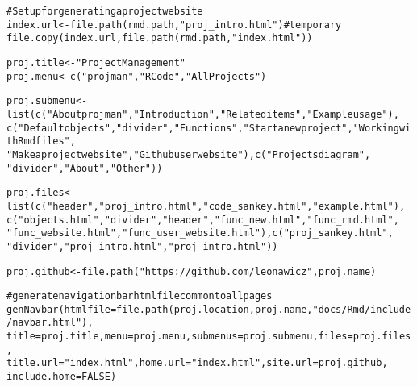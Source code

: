 \documentclass{article}\usepackage[]{graphicx}\usepackage[]{color}
\makeatletter
\newcommand{\hlnum}[1]{\textcolor[rgb]{0.863,0.196,0.184}{#1}}%
\newcommand{\hlstr}[1]{\textcolor[rgb]{0.863,0.196,0.184}{#1}}%
\newcommand{\hlcom}[1]{\textcolor[rgb]{0.345,0.431,0.459}{#1}}%
\newcommand{\hlstd}[1]{\textcolor[rgb]{0.514,0.58,0.588}{#1}}%
\newcommand{\hlkwb}[1]{\textcolor[rgb]{0.522,0.6,0}{#1}}%
\newcommand{\hlkwc}[1]{\textcolor[rgb]{0.796,0.294,0.086}{#1}}%
\newcommand{\hlkwd}[1]{\textcolor[rgb]{0.576,0.631,0.631}{#1}}%
\newenvironment{kframe}{%
 \def\at@end@of@kframe{}%
 \ifinner\ifhmode%
  \def\at@end@of@kframe{\end{minipage}}%
  \begin{minipage}{\columnwidth}%
 \fi\fi%
 \def\FrameCommand##1{\hskip\@totalleftmargin \hskip-\fboxsep
 \colorbox{shadecolor}{##1}\hskip-\fboxsep
     \hskip-\linewidth \hskip-\@totalleftmargin \hskip\columnwidth}%
 \MakeFramed {\advance\hsize-\width
   \@totalleftmargin\z@ \linewidth\hsize
   \@setminipage}}%
 {\par\unskip\endMakeFramed%
 \at@end@of@kframe}
\newenvironment{knitrout}{}{} %
\makeatother
\begin{document}
\begin{knitrout}
\color{fgcolor}\begin{kframe}
\begin{alltt}
\hlcom{# Setup for generating a project website}
\hlstd{index.url} \hlkwb{<-} \hlkwd{file.path}\hlstd{(rmd.path,} \hlstr{"proj_intro.html"}\hlstd{)}  \hlcom{# temporary}
\hlkwd{file.copy}\hlstd{(index.url,} \hlkwd{file.path}\hlstd{(rmd.path,} \hlstr{"index.html"}\hlstd{))}

\hlstd{proj.title} \hlkwb{<-} \hlstr{"Project Management"}
\hlstd{proj.menu} \hlkwb{<-} \hlkwd{c}\hlstd{(}\hlstr{"projman"}\hlstd{,} \hlstr{"R Code"}\hlstd{,} \hlstr{"All Projects"}\hlstd{)}

\hlstd{proj.submenu} \hlkwb{<-} \hlkwd{list}\hlstd{(}\hlkwd{c}\hlstd{(}\hlstr{"About projman"}\hlstd{,} \hlstr{"Introduction"}\hlstd{,} \hlstr{"Related items"}\hlstd{,} \hlstr{"Example usage"}\hlstd{),}
    \hlkwd{c}\hlstd{(}\hlstr{"Default objects"}\hlstd{,} \hlstr{"divider"}\hlstd{,} \hlstr{"Functions"}\hlstd{,} \hlstr{"Start a new project"}\hlstd{,} \hlstr{"Working with Rmd files"}\hlstd{,}
        \hlstr{"Make a project website"}\hlstd{,} \hlstr{"Github user website"}\hlstd{),} \hlkwd{c}\hlstd{(}\hlstr{"Projects diagram"}\hlstd{,}
        \hlstr{"divider"}\hlstd{,} \hlstr{"About"}\hlstd{,} \hlstr{"Other"}\hlstd{))}

\hlstd{proj.files} \hlkwb{<-} \hlkwd{list}\hlstd{(}\hlkwd{c}\hlstd{(}\hlstr{"header"}\hlstd{,} \hlstr{"proj_intro.html"}\hlstd{,} \hlstr{"code_sankey.html"}\hlstd{,} \hlstr{"example.html"}\hlstd{),}
    \hlkwd{c}\hlstd{(}\hlstr{"objects.html"}\hlstd{,} \hlstr{"divider"}\hlstd{,} \hlstr{"header"}\hlstd{,} \hlstr{"func_new.html"}\hlstd{,} \hlstr{"func_rmd.html"}\hlstd{,}
        \hlstr{"func_website.html"}\hlstd{,} \hlstr{"func_user_website.html"}\hlstd{),} \hlkwd{c}\hlstd{(}\hlstr{"proj_sankey.html"}\hlstd{,}
        \hlstr{"divider"}\hlstd{,} \hlstr{"proj_intro.html"}\hlstd{,} \hlstr{"proj_intro.html"}\hlstd{))}

\hlstd{proj.github} \hlkwb{<-} \hlkwd{file.path}\hlstd{(}\hlstr{"https://github.com/leonawicz"}\hlstd{, proj.name)}

\hlcom{# generate navigation bar html file common to all pages}
\hlkwd{genNavbar}\hlstd{(}\hlkwc{htmlfile} \hlstd{=} \hlkwd{file.path}\hlstd{(proj.location, proj.name,} \hlstr{"docs/Rmd/include/navbar.html"}\hlstd{),}
    \hlkwc{title} \hlstd{= proj.title,} \hlkwc{menu} \hlstd{= proj.menu,} \hlkwc{submenus} \hlstd{= proj.submenu,} \hlkwc{files} \hlstd{= proj.files,}
    \hlkwc{title.url} \hlstd{=} \hlstr{"index.html"}\hlstd{,} \hlkwc{home.url} \hlstd{=} \hlstr{"index.html"}\hlstd{,} \hlkwc{site.url} \hlstd{= proj.github,}
    \hlkwc{include.home} \hlstd{=} \hlnum{FALSE}\hlstd{)}


\end{alltt}
\end{kframe}
\end{knitrout}
\end{document}
